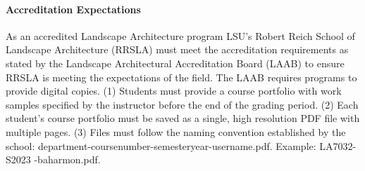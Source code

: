 \documentclass[11pt,article,oneside]{memoir}
\begin{document}
\paragraph{Accreditation Expectations}
As an accredited Landscape Architecture program
LSU's Robert Reich School of Landscape Architecture (RRSLA) 
must meet the accreditation requirements 
as stated by the Landscape Architectural Accreditation
Board (LAAB) to ensure RRSLA is meeting the expectations of the field. 
The LAAB requires programs to provide digital copies.
(1) Students must provide a course portfolio
with work samples specified by the instructor 
before the end of the grading period. 
(2) Each student's course portfolio must be saved as 
a single, high resolution PDF file with multiple pages. 
(3) Files must follow the naming convention
established by the school: department-coursenumber-semesteryear-username.pdf.
Example: LA7032-S2023 -baharmon.pdf.
\end{document}
